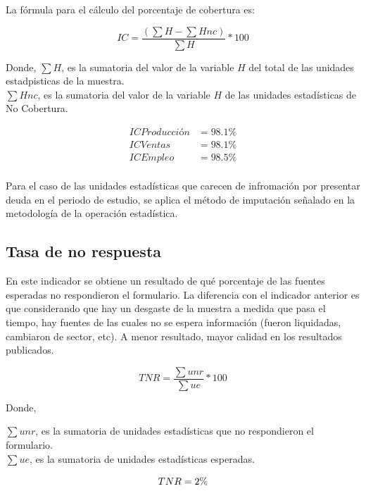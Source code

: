 \documentclass[
]{article}
\begin{document}
La fórmula para el cálculo del porcentaje de cobertura es:

\begin{equation*}
IC = \frac{(\sum H - \sum Hnc)}{\sum H}*100
\end{equation*}

Donde, \(\sum H\), es la sumatoria del valor de la variable \(H\) del
total de las unidades estadpisticas de la muestra.\\
\(\sum Hnc\), es la sumatoria del valor de la variable \(H\) de las
unidades estadísticas de No Cobertura.

\begin{align*}
ICProducción &= 98.1\%\\
ICVentas &= 98.1\%\\
ICEmpleo &= 98.5\%\\
\end{align*}

Para el caso de las unidades estadísticas que carecen de infromación por
presentar deuda en el periodo de estudio, se aplica el método de
imputación señalado en la metodología de la operación estadística.

\hypertarget{tasa-de-no-respuesta}{%
\subsection{Tasa de no respuesta}\label{tasa-de-no-respuesta}}

En este indicador se obtiene un resultado de qué porcentaje de las
fuentes esperadas no respondieron el formulario. La diferencia con el
indicador anterior es que considerando que hay un desgaste de la muestra
a medida que pasa el tiempo, hay fuentes de las cuales no se espera
información (fueron liquidadas, cambiaron de sector, etc). A menor
resultado, mayor calidad en los resultados publicados.

\begin{equation*}
TNR = \frac{\sum unr}{\sum ue}*100
\end{equation*}

Donde,

\(\sum unr\), es la sumatoria de unidades estadísticas que no
respondieron el formulario.\\
\(\sum ue\), es la sumatoria de unidades estadísticas esperadas.

\begin{equation*}
TNR = 2\%\\
\end{equation*}
\end{document}
